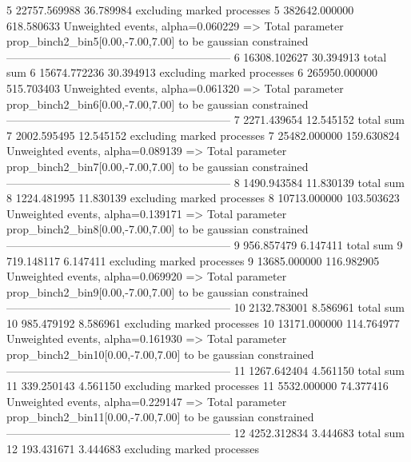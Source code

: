 5          22757.569988    36.789984       excluding marked processes    
5          382642.000000   618.580633      Unweighted events, alpha=0.060229
  => Total parameter prop_binch2_bin5[0.00,-7.00,7.00] to be gaussian constrained
------------------------------------------------------------
6          16308.102627    30.394913       total sum                     
6          15674.772236    30.394913       excluding marked processes    
6          265950.000000   515.703403      Unweighted events, alpha=0.061320
  => Total parameter prop_binch2_bin6[0.00,-7.00,7.00] to be gaussian constrained
------------------------------------------------------------
7          2271.439654     12.545152       total sum                     
7          2002.595495     12.545152       excluding marked processes    
7          25482.000000    159.630824      Unweighted events, alpha=0.089139
  => Total parameter prop_binch2_bin7[0.00,-7.00,7.00] to be gaussian constrained
------------------------------------------------------------
8          1490.943584     11.830139       total sum                     
8          1224.481995     11.830139       excluding marked processes    
8          10713.000000    103.503623      Unweighted events, alpha=0.139171
  => Total parameter prop_binch2_bin8[0.00,-7.00,7.00] to be gaussian constrained
------------------------------------------------------------
9          956.857479      6.147411        total sum                     
9          719.148117      6.147411        excluding marked processes    
9          13685.000000    116.982905      Unweighted events, alpha=0.069920
  => Total parameter prop_binch2_bin9[0.00,-7.00,7.00] to be gaussian constrained
------------------------------------------------------------
10         2132.783001     8.586961        total sum                     
10         985.479192      8.586961        excluding marked processes    
10         13171.000000    114.764977      Unweighted events, alpha=0.161930
  => Total parameter prop_binch2_bin10[0.00,-7.00,7.00] to be gaussian constrained
------------------------------------------------------------
11         1267.642404     4.561150        total sum                     
11         339.250143      4.561150        excluding marked processes    
11         5532.000000     74.377416       Unweighted events, alpha=0.229147
  => Total parameter prop_binch2_bin11[0.00,-7.00,7.00] to be gaussian constrained
------------------------------------------------------------
12         4252.312834     3.444683        total sum                     
12         193.431671      3.444683        excluding marked processes    
